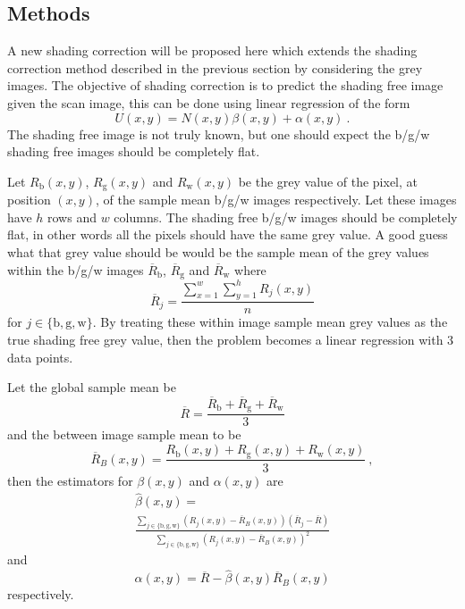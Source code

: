 \documentclass[a4paper]{proc}
\begin{document}
\subsection{Methods}
A new shading correction will be proposed here which extends the shading correction method described in the previous section by considering the grey images. The objective of shading correction is to predict the shading free image given the scan image, this can be done using linear regression of the form
\begin{equation}
U(x,y) = N(x,y)\beta(x,y)+\alpha(x,y) \ .
\end{equation}
The shading free image is not truly known, but one should expect the b/g/w shading free images should be completely flat.

Let $R_\text{b}(x,y)$, $R_\text{g}(x,y)$ and $R_\text{w}(x,y)$ be the grey value of the pixel, at position $(x,y)$, of the sample mean b/g/w images respectively. Let these images have $h$ rows and $w$ columns. The shading free b/g/w images should be completely flat, in other words all the pixels should have the same grey value. A good guess what that grey value should be would be the sample mean of the grey values within the b/g/w images $\overline{R}_\text{b}$, $\overline{R}_\text{g}$ and $\overline{R}_\text{w}$ where
\begin{equation}
\overline{R}_j=\frac{\sum_{x=1}^w\sum_{y=1}^hR_j(x,y)}{n}
\end{equation}
for $j\in\{\text{b},\text{g},\text{w}\}$. By treating these within image sample mean grey values as the true shading free grey value, then the problem becomes a linear regression with 3 data points.

Let the global sample mean be
\begin{equation}
\overline{R}=\frac{\overline{R}_\text{b} + \overline{R}_\text{g} + \overline{R}_\text{w}}{3}
\end{equation}
and the between image sample mean to be
\begin{equation}
\overline{R}_B(x,y)=\frac{R_\text{b}(x,y) + R_\text{g}(x,y) + R_\text{w}(x,y)}{3} \ ,
\end{equation}
then the estimators for $\beta(x,y)$ and $\alpha(x,y)$ are
\begin{multline}
\widehat{\beta}(x,y)=
\\
\frac{\sum_{j\in\{\text{b},\text{g},\text{w}\}}\left(R_j(x,y)-\overline{R}_B(x,y)\right)\left(\overline{R}_j-\overline{R}\right)}{\sum_{j\in\{\text{b},\text{g},\text{w}\}}\left(R_j(x,y)-\overline{R}_B(x,y)\right)^2}
\end{multline}
and
\begin{equation}
\widehat{\alpha}(x,y) = \overline{R}-\widehat{\beta}(x,y)\overline{R}_B(x,y) 
\end{equation}
respectively.
\end{document}
